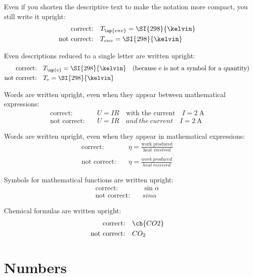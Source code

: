 Even if you shorten the descriptive text to make the notation more compact, you still write it upright:
\begin{align*}
    \text{correct:} \quad & T_\up{env} = \SI{298}{\kelvin} \\
    \text{not correct:} \quad & T_{env} = \SI{298}{\kelvin}
\end{align*}

Even descriptions reduced to a single letter are written upright:
\begin{align*}
    \text{correct:} \quad & T_\up{e} = \SI{298}{\kelvin}\quad \text{(because e is not a symbol for a quantity)} \\
    \text{not correct:} \quad & T_{e} = \SI{298}{\kelvin}
\end{align*}

Words are written upright, even when they appear between mathematical expressions:
\begin{align*}
    \text{correct:}     \quad &  U=I R \quad \text{with the current} \quad I=\SI{2}{\ampere}\\
    \text{not correct:} \quad &  U=I R \quad and\ the\ current \quad I=\SI{2}{\ampere}
\end{align*}

Words are written upright, even when they appear in mathematical expressions:
\begin{align*}
    \text{correct:}     \quad &   \eta=\frac{\text{work produced}}{\text{heat received}}\\
    \\
    \text{not correct:} \quad &   \eta=\frac{work\ produced}{heat\ received}
\end{align*}

Symbols for mathematical functions are written upright:
\begin{align*}
    \text{correct:}     \quad &   \sin\alpha\\
    \text{not correct:} \quad &   sin\alpha
\end{align*}

Chemical formulas are written upright:
\begin{align*}
    \text{correct:}     \quad &   \ch{CO2}\\
    \text{not correct:} \quad &       CO_2
\end{align*}

\section{Numbers}\label{sec:formatnumbers}
